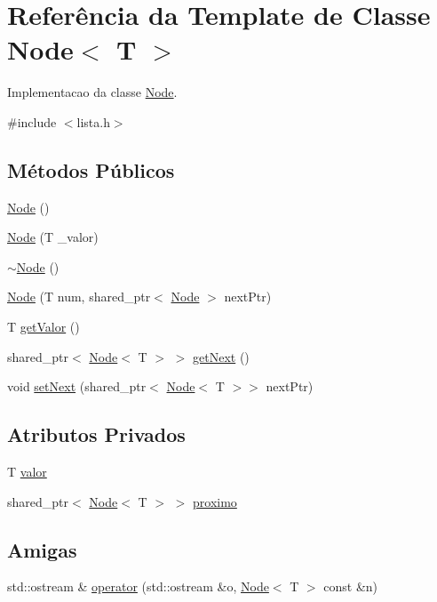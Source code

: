\hypertarget{classNode}{}\section{Referência da Template de Classe Node$<$ T $>$}
\label{classNode}


Implementacao da classe \hyperlink{classNode}{Node}.  




{\ttfamily \#include $<$lista.\+h$>$}

\subsection*{Métodos Públicos}
\begin{DoxyCompactItemize}
\item 
\hyperlink{classNode_a0ac1d44cfe588be564acf25485029bd8}{Node} ()
\item 
\hyperlink{classNode_ae00c7c803c5b2fea3b2270050da4a9db}{Node} (T \+\_\+valor)
\item 
\hyperlink{classNode_ae923d0417581dd19784d55b901f0f7f0}{$\sim$\+Node} ()
\item 
\hyperlink{classNode_af67f09d322ec9a1fc2852ff98f0a4558}{Node} (T num, shared\+\_\+ptr$<$ \hyperlink{classNode}{Node} $>$ next\+Ptr)
\item 
T \hyperlink{classNode_aac9fa54166ff3aa269de6da8f9484f66}{get\+Valor} ()
\item 
shared\+\_\+ptr$<$ \hyperlink{classNode}{Node}$<$ T $>$ $>$ \hyperlink{classNode_a85f16577c580d8fdc246f350c5a6141a}{get\+Next} ()
\item 
void \hyperlink{classNode_a73ec6e581244130c98a26ed2935cf472}{set\+Next} (shared\+\_\+ptr$<$ \hyperlink{classNode}{Node}$<$ T $>$$>$ next\+Ptr)
\end{DoxyCompactItemize}
\subsection*{Atributos Privados}
\begin{DoxyCompactItemize}
\item 
T \hyperlink{classNode_ae7133548e1ffddfd6bab32e684094dbe}{valor}
\item 
shared\+\_\+ptr$<$ \hyperlink{classNode}{Node}$<$ T $>$ $>$ \hyperlink{classNode_a26c14ea34fca953ae3f847245c3e9caa}{proximo}
\end{DoxyCompactItemize}
\subsection*{Amigas}
\begin{DoxyCompactItemize}
\item 
std\+::ostream \& \hyperlink{classNode_af4dd23ddeacb247749f1f4fc7e22d96f}{operator} (std\+::ostream \&o, \hyperlink{classNode}{Node}$<$ T $>$ const \&n)
\end{DoxyCompactItemize}


